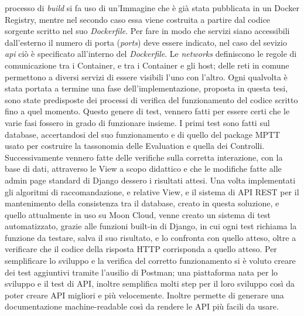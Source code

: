 processo di \textit{build} si fa uso di un'Immagine che è già stata pubblicata in un Docker Registry, mentre nel secondo caso essa viene costruita 
a partire dal codice sorgente scritto nel suo \textit{Dockerfile}. Per fare in modo che servizi siano accessibili dall'esterno il numero di porta 
(\textit{ports}) deve essere indicato, nel caso del sevizio \textit{api} ciò è specificato all'interno del \textit{Dockerfile}.\hfill\break
Le \textit{networks} definiscono le regole di comunicazione tra i Container, e tra i Container e gli host; delle reti in comune 
permettono a diversi servizi di essere visibili l'uno con l'altro.
%
\vspace{1.5 cm}
\hfill\break
Ogni qualvolta è stata portata a termine una fase dell'implementazione, proposta in questa tesi, sono state predisposte 
dei processi di verifica del funzionamento del codice scritto fino a quel momento. Questo genere di test, vennero fatti 
per essere certi che le varie fasi fossero in grado di funzionare insieme.\hfill\break
I primi test sono fatti sul database, accertandosi del suo funzionamento e di quello del package MPTT usato 
per costruire la tassonomia delle Evaluation e quella dei Controlli. Successivamente vennero fatte delle verifiche sulla 
corretta interazione, con la base di dati, attraverso le View a scopo didattico e che le modifiche fatte alle admin page 
standard di Django dessero i risultati attesi. Una volta implementati gli algoritmi di raccomandazione, e relative View, 
e il sistema di API REST per il mantenimento della consistenza tra il database, creato in questa soluzione, e quello 
attualmente in uso su Moon Cloud, venne creato un sistema di test automatizzato, grazie alle funzioni built-in di Django, 
in cui ogni test richiama la funzione da testare, salva il suo risultato, e lo confronta con quello atteso, 
oltre a verificare che il codice della risposta HTTP corrisponda a quello atteso.\hfill\break
Per semplificare lo sviluppo e la verifica del corretto funzionamento si è voluto creare dei test aggiuntivi tramite 
l'ausilio di Postman; una piattaforma nata per lo sviluppo e il test di API, inoltre semplifica molti step per il loro 
sviluppo così da poter creare API migliori e più velocemente. Inoltre permette di generare una documentazione 
machine-readable così da rendere le API più facili da usare.

